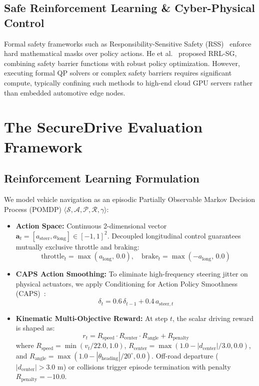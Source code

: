 \documentclass[conference]{IEEEtran}
\begin{document}
\subsection{Safe Reinforcement Learning \& Cyber-Physical Control}
Formal safety frameworks such as Responsibility-Sensitive Safety (RSS)~\cite{shalev2017formal} enforce hard mathematical masks over policy actions. He et al.~\cite{he2024trustworthy} proposed RRL-SG, combining safety barrier functions with robust policy optimization. However, executing formal QP solvers or complex safety barriers requires significant compute, typically confining such methods to high-end cloud GPU servers rather than embedded automotive edge nodes.

\section{The SecureDrive Evaluation Framework}

\subsection{Reinforcement Learning Formulation}
We model vehicle navigation as an episodic Partially Observable Markov Decision Process (POMDP) $\langle \mathcal{S}, \mathcal{A}, \mathcal{P}, \mathcal{R}, \gamma \rangle$:
\begin{itemize}
    \item \textbf{Action Space:} Continuous 2-dimensional vector $\mathbf{a}_t = [a_{\text{steer}}, a_{\text{long}}] \in [-1, 1]^2$. Decoupled longitudinal control guarantees mutually exclusive throttle and braking:
    \begin{equation}
        \text{throttle}_t = \max(a_{\text{long}}, \, 0.0), \quad \text{brake}_t = \max(-a_{\text{long}}, \, 0.0)
    \end{equation}
    \item \textbf{CAPS Action Smoothing:} To eliminate high-frequency steering jitter on physical actuators, we apply Conditioning for Action Policy Smoothness (CAPS)~\cite{caps2021}:
    \begin{equation}
        \delta_t = 0.6 \, \delta_{t-1} + 0.4 \, a_{\text{steer}, t}
    \end{equation}
    \item \textbf{Kinematic Multi-Objective Reward:} At step $t$, the scalar driving reward is shaped as:
    \begin{equation}
        r_t = R_{\text{speed}} \cdot R_{\text{center}} \cdot R_{\text{angle}} + R_{\text{penalty}}
    \end{equation}
    where $R_{\text{speed}} = \min(v_t / 22.0, 1.0)$, $R_{\text{center}} = \max(1.0 - |d_{\text{center}}| / 3.0, 0.0)$, and $R_{\text{angle}} = \max(1.0 - |\theta_{\text{heading}}| / 20^\circ, 0.0)$. Off-road departure ($|d_{\text{center}}| > 3.0\text{ m}$) or collisions trigger episode termination with penalty $R_{\text{penalty}} = -10.0$.
\end{itemize}
\end{document}
